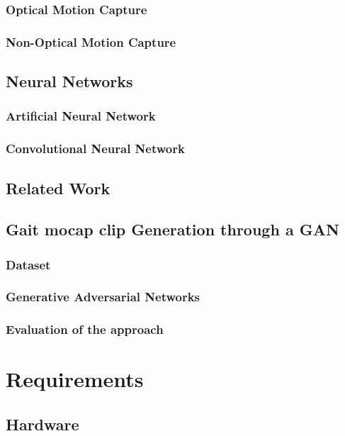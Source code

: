 \documentclass[12pt,oneside,a4paper,english]{article}
\begin{document}
\subsubsection{Optical Motion Capture}
 
\pagebreak
\subsubsection{Non-Optical Motion Capture}
 
\subsection{Neural Networks}
\subsubsection{Artificial Neural Network}
 
\subsubsection{Convolutional Neural Network}

\subsection{Related Work}
 
\subsection{Gait mocap clip Generation through a GAN}

\subsubsection{Dataset}

\subsubsection{Generative Adversarial Networks}

\subsubsection{Evaluation of the approach}

\newpage
\section{Requirements}
\subsection{Hardware}

\end{document}
